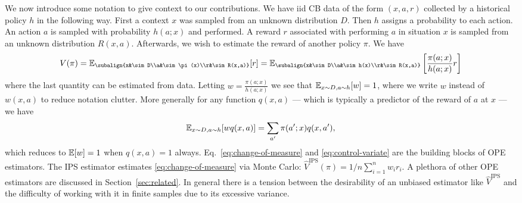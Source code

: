 We now introduce some notation to give context to our contributions.  We have
iid CB data of the form $(x,a,r)$ collected by a historical
policy $h$ in the following way. First a context $x$ was sampled from an unknown
distribution $D$.  Then $h$ assigns a probability to each action.  An action
$a$ is sampled with probability $h(a;x)$ and performed. A reward $r$ associated
with performing $a$ in situation $x$ is sampled from an unknown distribution
$R(x,a)$.  Afterwards, we wish to estimate the reward of another policy $\pi$. We have
\begin{equation}
\label{eq:change-of-measure}
V(\pi) = \E_{\subalign{x&\sim D\\a&\sim\pi(x)\\r&\sim R(x,a)}}[r]
=
\E_{\subalign{x&\sim D\\a&\sim h(x)\\r&\sim R(x,a)}}\left[\frac{\pi(a;x)}{h(a;x)}r\right]
\end{equation}
where the last quantity can be estimated from data.
%
Letting $w=\frac{\pi(a;x)}{h(a;x)}$  we see that 
$\mathbb{E}_{x\sim D,a\sim h}[w]=1$, where we write $w$ instead of $w(x,a)$ to reduce notation clutter. More generally
for any function $q(x,a)$ --- which is typically a predictor of the reward of $a$ at $x$ --- we have
\begin{equation}
\label{eq:control-variate}
\mathbb{E}_{x\sim D,a\sim h}[w q(x,a)] = \sum_{a'} \pi(a';x) q(x,a'),    
\end{equation}
which reduces to $\mathbb{E}[w]=1$ when $q(x,a)=1$ always.
Eq.~\eqref{eq:change-of-measure} and \eqref{eq:control-variate} are the
building blocks of OPE estimators.  The IPS estimator \cite{HT52} estimates
\eqref{eq:change-of-measure} via Monte Carlo: $\hat{V}^{\textrm{IPS}}(\pi) =
1/n \sum_{i=1}^n w_i r_i $.  A plethora of other OPE estimators are discussed
in Section~\ref{sec:related}. In general there is a tension between the
desirability of an unbiased estimator like $\hat V^{\textrm{IPS}}$ and the
difficulty of working with it in finite samples due to its excessive
variance.

